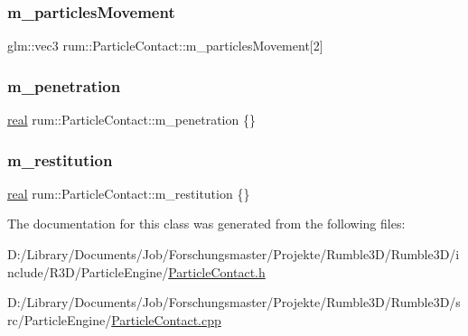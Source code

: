 \mbox{\label{classrum_1_1_particle_contact_ab03921d708387e5bbc3a0c01f1f5a3da}} 
\subsubsection{\texorpdfstring{m\+\_\+particles\+Movement}{m\_particlesMovement}}
{\footnotesize\ttfamily glm\+::vec3 rum\+::\+Particle\+Contact\+::m\+\_\+particles\+Movement\mbox{[}2\mbox{]}}

\mbox{\label{classrum_1_1_particle_contact_a935966849508ec47d3c6330816f873de}} 
\subsubsection{\texorpdfstring{m\+\_\+penetration}{m\_penetration}}
{\footnotesize\ttfamily \mbox{\hyperlink{namespacerum_a7e8cca23573d5eaead0f138cbaa4862c}{real}} rum\+::\+Particle\+Contact\+::m\+\_\+penetration \{\}}

\mbox{\label{classrum_1_1_particle_contact_a0be16bc823ae27866228345eb3349482}} 
\subsubsection{\texorpdfstring{m\+\_\+restitution}{m\_restitution}}
{\footnotesize\ttfamily \mbox{\hyperlink{namespacerum_a7e8cca23573d5eaead0f138cbaa4862c}{real}} rum\+::\+Particle\+Contact\+::m\+\_\+restitution \{\}}



The documentation for this class was generated from the following files\+:\begin{DoxyCompactItemize}
\item 
D\+:/\+Library/\+Documents/\+Job/\+Forschungsmaster/\+Projekte/\+Rumble3\+D/\+Rumble3\+D/include/\+R3\+D/\+Particle\+Engine/\mbox{\hyperlink{_particle_contact_8h}{Particle\+Contact.\+h}}\item 
D\+:/\+Library/\+Documents/\+Job/\+Forschungsmaster/\+Projekte/\+Rumble3\+D/\+Rumble3\+D/src/\+Particle\+Engine/\mbox{\hyperlink{_particle_contact_8cpp}{Particle\+Contact.\+cpp}}\end{DoxyCompactItemize}
